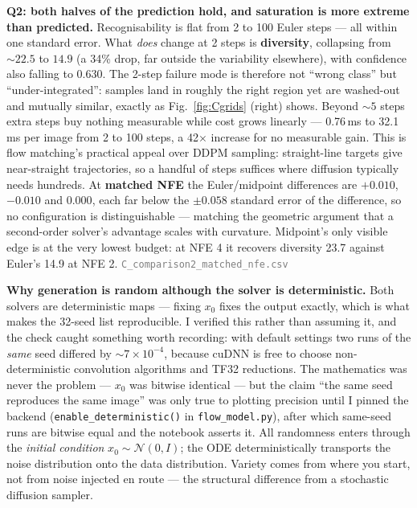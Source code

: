 \documentclass[10pt,a4paper]{article}
\begin{document}
\textbf{Q2: both halves of the prediction hold, and saturation is more extreme than predicted.}
Recognisability is flat from 2 to 100 Euler steps --- all within one standard error. What \emph{does}
change at 2 steps is \textbf{diversity}, collapsing from ${\sim}22.5$ to $\mathbf{14.9}$ (a 34\% drop,
far outside the variability elsewhere), with confidence also falling to 0.630. The 2-step failure mode
is therefore not ``wrong class'' but ``under-integrated'': samples land in roughly the right region yet
are washed-out and mutually similar, exactly as Fig.~\ref{fig:Cgrids} (right) shows. Beyond ${\sim}5$
steps extra steps buy nothing measurable while cost grows linearly --- 0.76\,ms to 32.1\,ms per image
from 2 to 100 steps, a 42$\times$ increase for no measurable gain. This is flow matching's practical
appeal over DDPM sampling: straight-line targets give near-straight trajectories, so a handful of steps
suffices where diffusion typically needs hundreds. At \textbf{matched NFE} the Euler/midpoint
differences are $+0.010$, $-0.010$ and $0.000$, each far below the $\pm0.058$ standard error of the
difference, so no configuration is distinguishable --- matching the geometric argument that a
second-order solver's advantage scales with curvature. Midpoint's only visible edge is at the very
lowest budget: at NFE 4 it recovers diversity 23.7 against Euler's 14.9 at NFE 2.
\textcolor{gray}{\small\texttt{C\_comparison2\_matched\_nfe.csv}}

\textbf{Why generation is random although the solver is deterministic.} Both solvers are deterministic
maps --- fixing $x_0$ fixes the output exactly, which is what makes the 32-seed list reproducible. I
verified this rather than assuming it, and the check caught something worth recording: with default
settings two runs of the \emph{same} seed differed by ${\sim}7\times10^{-4}$, because cuDNN is free to
choose non-deterministic convolution algorithms and TF32 reductions. The mathematics was never the
problem --- $x_0$ was bitwise identical --- but the claim ``the same seed reproduces the same image''
was only true to plotting precision until I pinned the backend (\texttt{enable\_deterministic()} in
\texttt{flow\_model.py}), after which same-seed runs are bitwise equal and the notebook asserts it. All
randomness enters through the \emph{initial condition} $x_0\sim\mathcal{N}(0,I)$; the ODE
deterministically transports the noise distribution onto the data distribution. Variety comes from
where you start, not from noise injected en route --- the structural difference from a stochastic
diffusion sampler.
\end{document}
